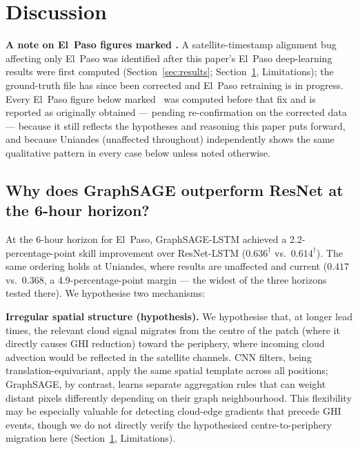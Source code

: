 \section{Discussion}
\label{sec:discussion}

\textbf{A note on El~Paso figures marked \dag.} A satellite-timestamp
alignment bug affecting only El~Paso was identified after this paper's
El~Paso deep-learning results were first computed (Section~\ref{sec:results};
Section~\ref{sec:discussion}, Limitations); the ground-truth file has since
been corrected and El~Paso retraining is in progress. Every El~Paso figure
below marked \dag\ was computed before that fix and is reported as
originally obtained --- pending re-confirmation on the corrected data ---
because it still reflects the hypotheses and reasoning this paper puts
forward, and because Uniandes (unaffected throughout) independently shows
the same qualitative pattern in every case below unless noted otherwise.

\subsection{Why does GraphSAGE outperform ResNet at the 6-hour horizon?}

At the 6-hour horizon for El~Paso, GraphSAGE-LSTM achieved a 2.2-percentage-point
skill improvement over ResNet-LSTM ($0.636^\dagger$ vs.\ $0.614^\dagger$). The same
ordering holds at Uniandes, where results are unaffected and current
($0.417$ vs.\ $0.368$, a 4.9-percentage-point margin --- the widest of the
three horizons tested there). We hypothesise two
mechanisms:

\textbf{Irregular spatial structure (hypothesis).} We hypothesise that, at
longer lead times, the relevant cloud signal migrates from the centre of the
patch (where it directly causes GHI reduction) toward the periphery, where
incoming cloud advection would be reflected in the satellite channels. CNN
filters, being translation-equivariant, apply the same spatial template
across all positions; GraphSAGE, by contrast, learns separate aggregation
rules that can weight distant pixels differently depending on their graph
neighbourhood. This flexibility may be especially valuable for detecting
cloud-edge gradients that precede GHI events, though we do not directly
verify the hypothesised centre-to-periphery migration here (Section~\ref{sec:discussion}, Limitations).

